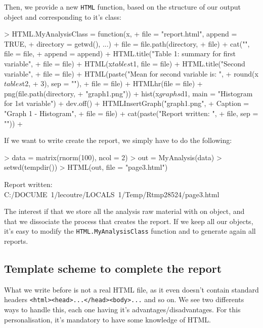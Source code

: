 \documentclass[a4paper]{article}
\begin{document}
Then, we provide a new \verb+HTML+ function, based on the structure of our output object and corresponding to it's class:


\begin{Schunk}
\begin{Sinput}
> HTML.MyAnalysisClass = function(x, 
+     file = "report.html", append = TRUE, 
+     directory = getwd(), ...) {
+     file = file.path(directory, 
+         file)
+     cat("\n", file = file, 
+         append = append)
+     HTML.title("Table 1: summary for first variable", 
+         file = file)
+     HTML(x$tables$t1, file = file)
+     HTML.title("Second variable", 
+         file = file)
+     HTML(paste("Mean for second variable is: ", 
+         round(x$tables$t2, 
+             3), sep = ""), 
+         file = file)
+     HTMLhr(file = file)
+     png(file.path(directory, 
+         "graph1.png"))
+     hist(x$graphs$d1, main = "Histogram for 1st variable")
+     dev.off()
+     HTMLInsertGraph("graph1.png", 
+         Caption = "Graph 1 - Histogram", 
+         file = file)
+     cat(paste("Report written: ", 
+         file, sep = ""))
+ }
\end{Sinput}
\end{Schunk}

If we want to write create the report, we simply have to do the following:

\begin{Schunk}
\begin{Sinput}
> data = matrix(rnorm(100), ncol = 2)
> out = MyAnalysis(data)
> setwd(tempdir())
> HTML(out, file = "page3.html")
\end{Sinput}
\begin{Soutput}
Report written: C:/DOCUME~1/lecoutre/LOCALS~1/Temp/Rtmp28524/page3.html
\end{Soutput}
\end{Schunk}

The interest if that we store all the analysis raw material with on object, and that we dissociate the process that creates the report. If we keep all our objects, it's easy to modify the \verb+HTML.MyAnalysisClass+ function and to generate again all reports.

\subsection*{Template scheme to complete the report}

What we write before is not a real HTML file, as it even doesn't contain standard headers \verb+<html><head>...</head><body>...+ and so on. We see two differents ways to handle this, each one having it's advantages/disadvantages. For this personalisation, it's mandatory to have some knowledge of HTML.
\end{document}

